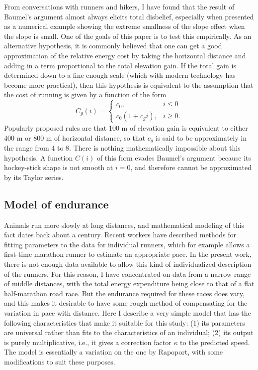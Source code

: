 \documentclass[10pt,letterpaper]{article}
\begin{document}
From conversations with runners and hikers, I have found that the result of Baumel's argument almost
always elicits total disbelief, especially when presented as a numerical example showing the extreme smallness
of the slope effect when the slope is small. One of the goals of this paper is to test this empirically.
As an alternative hypothesis, it is commonly believed that one can get a good approximation
of the relative energy cost by taking the horizontal distance and adding in a term proportional to the total elevation gain.
If the total gain is determined down to a fine enough scale (which with modern technology has become
more practical), then this hypothesis is equivalent to the assumption that the cost of running is
given by a function of the form
\begin{equation}\label{eq:gain-only}
   C_g(i) = 
  \begin{cases}
     c_0, & i\le0 \\
     c_0(1+c_g i), & i\ge 0.
  \end{cases}
\end{equation}
Popularly proposed rules are that 100 m of elevation gain is equivalent to either 400 m or 800 m of horizontal distance,
so that $c_g$ is said to be approximately in the range from 4 to 8. There is nothing mathematically impossible
about this hypothesis. A function $C(i)$ of this form evades Baumel's argument because its hockey-stick shape
is not smooth at $i=0$, and therefore cannot be approximated by its Taylor series.





\subsection*{Model of endurance}

Animals run more slowly at long distances, and mathematical modeling of this fact dates back
about a century.\cite{hill} Recent workers have described methods for fitting parameters
to the data for individual runners,\cite{rapoport}\cite{emig} which for example allows
a first-time marathon runner to estimate an appropriate pace. In the present work, there is
not enough data available to allow this kind of individualized description of the runners.
For this reason, I have concentrated on data from a narrow range of middle distances,
with the total energy expenditure being close to that of a flat half-marathon road race.
But the endurance required for these races does vary, and this makes it desirable to have
some rough method of compensating for the variation in pace with distance. Here I describe
a very simple model that has the following characteristics that make it suitable for this
study: (1) its parameters are universal rather than fits to the characteristics of an individual;
(2) its output is purely multiplicative, i.e., it gives a correction factor $\kappa$ to the predicted speed.
The model is essentially a variation on the one by Rapoport,\cite{rapoport} with some modifications
to suit these purposes.
\end{document}

